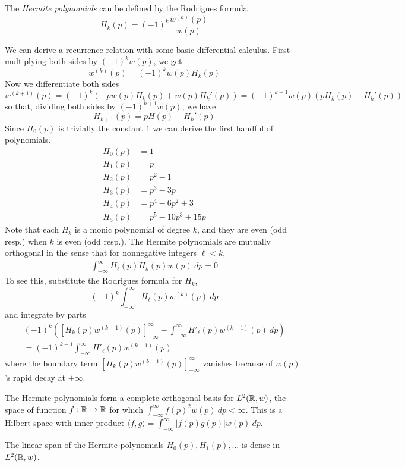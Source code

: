 
\begin{definition}
  The \textit{Hermite polynomials} can be defined by the Rodrigues formula
  \[
      H_k(p) = {(-1)}^k \frac{w^{(k)}(p)}{w(p)}
  \]
  
\end{definition}

We can derive a recurrence relation with some basic differential calculus. First multiplying both sides by $(-1)^kw(p)$, we get
\[
   w^{(k)}(p) = {(-1)}^k w(p)H_k(p)
\]
Now we differentiate both sides 
\[
  w^{(k+1)}(p) 
    = {(-1)}^{k} (-pw(p)H_k(p) + w(p)H_k'(p)) 
    = {(-1)}^{k+1} w(p)(pH_k(p) - H_k'(p))
\]
so that, dividing both sides by ${(-1)}^{k+1} w(p)$, we have
\[
  H_{k+1}(p) = pH(p) - H_k'(p)
\]
Since $H_0(p)$ is trivially the constant $1$ we can derive the first handful of polynomials.
\begin{align*}
  H_0(p) &= 1 \\
  H_1(p) &= p \\
  H_2(p) &= p^2 - 1 \\
  H_3(p) &= p^3 - 3p \\
  H_4(p) &= p^4 - 6p^2 + 3 \\
  H_5(p) &= p^5 - 10p^3 + 15p
\end{align*}
Note that each $H_k$ is a monic polynomial of  degree $k$, and they are even (odd resp.) when $k$ is even (odd resp.).
The Hermite polynomials are mutually orthogonal in the sense that for nonnegative integers $\ell < k$,
\begin{align*}
  \int_{-\infty}^\infty H_\ell(p) H_k(p) w(p)~dp 
  = 0
\end{align*}
To see this, substitute the Rodrigues formula for $H_k$,
\[
  (-1)^k \int_{-\infty}^\infty H_\ell(p) w^{(k)}(p)~dp
\]
and integrate by parts
\begin{align*}
  (-1)^k \left(\left[H_k(p)w^{(k-1)}(p)\right]_{-\infty}^\infty - \int_{-\infty}^\infty H'_\ell(p) w^{(k-1)}(p)~dp\right) \\
  = (-1)^{k-1}\int_{-\infty}^\infty H'_\ell(p) w^{(k-1)}(p)
\end{align*}
where the boundary term $\left[H_k(p)w^{(k-1)}(p)\right]_{-\infty}^\infty$ vanishes because of $w(p)$'s rapid decay at $\pm \infty$.

The Hermite polynomials form a complete orthogonal basis for $L^2(\mathbb{R}, w)$, the space of function $f : \mathbb{R} \to \mathbb{R}$ for which $\int_{-\infty}^\infty f(p)^2 w(p)~dp < \infty$. This is a Hilbert space with inner product $\langle f, g \rangle = \int_{-\infty}^\infty |f(p)g(p)| w(p)~dp$.
\begin{proposition}
   The linear span of the Hermite polynomials $H_0(p), H_1(p), \ldots$ is dense in $L^2(\mathbb{R}, w)$.
\end{proposition}

